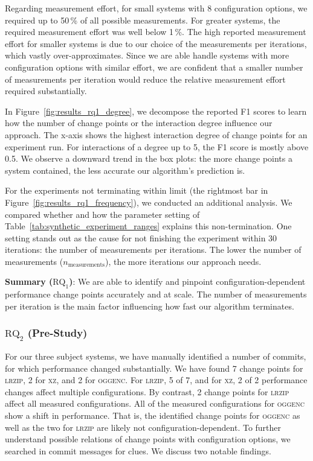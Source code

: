 \documentclass[sigconf, screen]{acmart}
\newcommand{\greybox}[1]{
	\begin{mdframed}[backgroundcolor=black!10!white,linewidth=0pt,backgroundcolor=indigo2!10,linewidth=0pt,innerleftmargin=5pt,innertopmargin=5pt]
		#1
	\end{mdframed}
}
\begin{document}
	Regarding measurement effort, for small systems with 8 configuration options, we required up to 50\,\% of all possible measurements. For greater systems, the required measurement effort was well below 1\,\%. The high reported measurement effort for smaller systems is due to our choice of the measurements per iterations, which vastly over-approximates. Since we are able handle systems with more configuration options with similar effort, we are confident that a smaller number of measurements per iteration would reduce the relative measurement effort required substantially.
	
	In Figure~\ref{fig:results_rq1_degree}, we decompose the reported F1 scores to learn how the number of change points or the interaction degree influence our approach. The x-axis shows the highest interaction degree of change points for an experiment run. For interactions of a degree up to 5, the F1 score is mostly above 0.5. We observe a downward trend in the box plots: the more change points a system contained, the less accurate our algorithm's prediction is.
	
	For the experiments not terminating within limit (the rightmost bar in Figure~\ref{fig:results_rq1_frequency}), we conducted an additional analysis. We compared whether and how the parameter setting of Table~\ref{tab:synthetic_experiment_ranges} explains this non-termination. One setting stands out as the cause for not finishing the experiment within 30 iterations: the number of measurements per iterations. The lower the number of measurements ($n_\text{measurements}$), the more iterations our approach needs.
	\vspace{2mm}
	\greybox{
		\textbf{Summary ($\text{RQ}_1$)}: We are able to identify and pinpoint config\-uration-dependent performance change points accurately and at scale. The number of measurements per iteration is the main factor influencing how fast our algorithm terminates.
	}
	
	\subsubsection{$\text{RQ}_2$ (Pre-Study)}
	For our three subject systems, we have manually identified a number of commits, for which performance chang\-ed substantially. We have found 7 change points for \textsc{lrzip}, 2 for \textsc{xz}, and 2 for \textsc{oggenc}. For \textsc{lrzip}, 5 of 7, and for \textsc{xz}, 2 of 2 performance changes affect multiple configurations. By contrast, 2 change points for \textsc{lrzip} affect all measured configurations. All of the measured configurations for \textsc{oggenc} show a shift in performance. That is, the identified change points for \textsc{oggenc} as well as the two for \textsc{lrzip} are likely not configuration-dependent. 	
	To further understand possible relations of change points with configuration options, we searched in commit messages for clues. We discuss two notable findings. 
	
\end{document}
